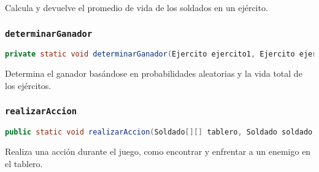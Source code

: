 Calcula y devuelve el promedio de vida de los soldados en un ejército.

\subsubsection{\texttt{determinarGanador}}
\begin{lstlisting}[language=Java]
private static void determinarGanador(Ejercito ejercito1, Ejercito ejercito2, String reinoJugador1, String reinoJugador2)
\end{lstlisting}

Determina el ganador basándose en probabilidades aleatorias y la vida total de los ejércitos.

\subsubsection{\texttt{realizarAccion}}
\begin{lstlisting}[language=Java]
public static void realizarAccion(Soldado[][] tablero, Soldado soldado, ArrayList<Soldado> ejercito, ArrayList<Soldado> ejercitoE, Scanner sc)
\end{lstlisting}

Realiza una acción durante el juego, como encontrar y enfrentar a un enemigo en el tablero.

